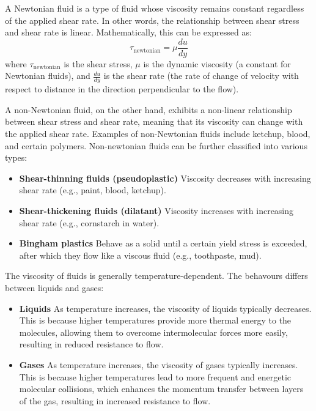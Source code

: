 \documentclass[11pt]{report}
\begin{document}
\begin{definition}
    A Newtonian fluid is a type of fluid whose viscosity remains constant regardless of the applied shear rate. In other words, the relationship between shear stress and shear rate is linear. Mathematically, this can be expressed as:
    \begin{equation}
        \tau_\text{newtonian}= \mu \frac{du}{dy}
    \end{equation}
    where \(\tau_\text{newtonian}\) is the shear stress, \(\mu\) is the dynamic viscosity (a constant for Newtonian fluids), and \(\frac{du}{dy}\) is the shear rate (the rate of change of velocity with respect to distance in the direction perpendicular to the flow).
    
    A non-Newtonian fluid, on the other hand, exhibits a non-linear relationship between shear stress and shear rate, meaning that its viscosity can change with the applied shear rate. Examples of non-Newtonian fluids include ketchup, blood, and certain polymers. Non-newtonian fluids can be further classified into various types:
    \begin{itemize}
        \item \textbf{Shear-thinning fluids (pseudoplastic)} Viscosity decreases with increasing shear rate (e.g., paint, blood, ketchup).
        \item \textbf{Shear-thickening fluids (dilatant)} Viscosity increases with increasing shear rate (e.g., cornstarch in water).
        \item \textbf{Bingham plastics} Behave as a solid until a certain yield stress is exceeded, after which they flow like a viscous fluid (e.g., toothpaste, mud).
    \end{itemize}
\end{definition}

\begin{definition}
    The viscosity of fluids is generally temperature-dependent. The behavours differs between liquids and gases:
    \begin{itemize}
        \item \textbf{Liquids} As temperature increases, the viscosity of liquids typically decreases. This is because higher temperatures provide more thermal energy to the molecules, allowing them to overcome intermolecular forces more easily, resulting in reduced resistance to flow.
        \item \textbf{Gases} As temperature increases, the viscosity of gases typically increases. This is because higher temperatures lead to more frequent and energetic molecular collisions, which enhances the momentum transfer between layers of the gas, resulting in increased resistance to flow.
    \end{itemize}
\end{definition}
\end{document}

